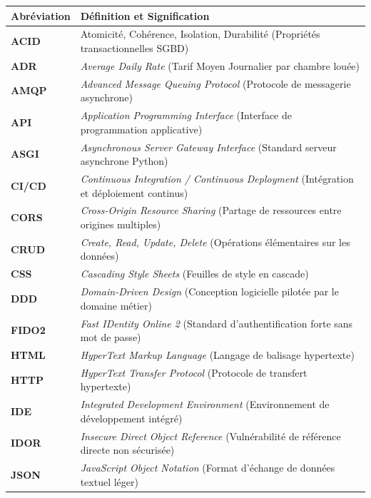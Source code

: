 \documentclass[12pt,a4paper,oneside]{report}
\begin{document}
\begin{table}[H]
\centering
\small
\renewcommand{\arraystretch}{1.35}
\begin{tabularx}{\textwidth}{|p{3.5cm}|X|}
\hline
\textbf{Abréviation} & \textbf{Définition et Signification} \\
\hline
\textbf{ACID} & Atomicité, Cohérence, Isolation, Durabilité (Propriétés transactionnelles SGBD) \\
\hline
\textbf{ADR} & \textit{Average Daily Rate} (Tarif Moyen Journalier par chambre louée) \\
\hline
\textbf{AMQP} & \textit{Advanced Message Queuing Protocol} (Protocole de messagerie asynchrone) \\
\hline
\textbf{API} & \textit{Application Programming Interface} (Interface de programmation applicative) \\
\hline
\textbf{ASGI} & \textit{Asynchronous Server Gateway Interface} (Standard serveur asynchrone Python) \\
\hline
\textbf{CI/CD} & \textit{Continuous Integration / Continuous Deployment} (Intégration et déploiement continus) \\
\hline
\textbf{CORS} & \textit{Cross-Origin Resource Sharing} (Partage de ressources entre origines multiples) \\
\hline
\textbf{CRUD} & \textit{Create, Read, Update, Delete} (Opérations élémentaires sur les données) \\
\hline
\textbf{CSS} & \textit{Cascading Style Sheets} (Feuilles de style en cascade) \\
\hline
\textbf{DDD} & \textit{Domain-Driven Design} (Conception logicielle pilotée par le domaine métier) \\
\hline
\textbf{FIDO2} & \textit{Fast IDentity Online 2} (Standard d'authentification forte sans mot de passe) \\
\hline
\textbf{HTML} & \textit{HyperText Markup Language} (Langage de balisage hypertexte) \\
\hline
\textbf{HTTP} & \textit{HyperText Transfer Protocol} (Protocole de transfert hypertexte) \\
\hline
\textbf{IDE} & \textit{Integrated Development Environment} (Environnement de développement intégré) \\
\hline
\textbf{IDOR} & \textit{Insecure Direct Object Reference} (Vulnérabilité de référence directe non sécurisée) \\
\hline
\textbf{JSON} & \textit{JavaScript Object Notation} (Format d'échange de données textuel léger) \\

\end{tabularx}
\end{table}
\end{document}
